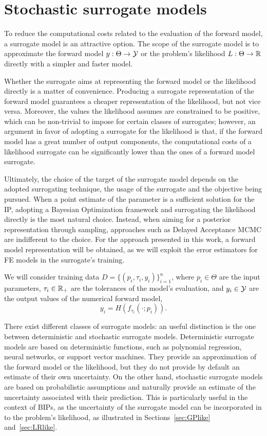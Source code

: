 \section{Stochastic surrogate models}\label{sec:surrogates}
To reduce the computational costs related to the evaluation of the forward model, a surrogate model is an attractive option.
The scope of the surrogate model is to approximate the forward model $y : \Theta \rightarrow \mathcal Y $ or the problem's likelihood $L: \Theta \rightarrow \mathbb{R} $ directly with a simpler and faster model.\newline

Whether the surrogate aims at representing the forward model or the likelihood directly is a matter of convenience.
Producing a surrogate representation of the forward model guarantees a cheaper representation of the likelihood, but not vice versa. Moreover, the values the likelihood assumes are constrained to be positive, which can be non-trivial to impose for certain classes of surrogates; however, an argument in favor of adopting a surrogate for the likelihood is that, if the forward model has a great number of output components, the computational costs of a likelihood surrogate can be significantly lower than the ones of a forward model surrogate.

Ultimately, the choice of the target of the surrogate model depends on the adopted surrogating technique, the usage of the surrogate and the objective being pursued.
When a point estimate of the parameter is a sufficient solution for the IP, adopting a Bayesian Optimization framework and surrogating the likelihood directly is the most natural choice.
Instead, when aiming for a posterior representation through sampling, approaches such as Delayed Acceptance MCMC \cite{ChristenFox2005} are indifferent to the choice.
For the approach presented in this work, a forward model representation will be obtained, as we will exploit the error estimators for FE models in the surrogate's training. \newline

We will consider training data $ D =\{ (p_i, \tau_i, y_i) \}_{i=1}^n $, where $ p_i \in \Theta $ are the input parameters, $ \tau_i \in \mathbb{R}_+ $ are the tolerances of the model's evaluation, and $ y_i \in \mathcal Y $ are the output values of the numerical forward model,\[ y_i = H(f_{\tau_i}(\cdot; p_i)). \]

There exist different classes of surrogate models: an useful distinction is the one between deterministic and stochastic surrogate models.
Deterministic surrogate models are based on deterministic functions, such as polynomial regression, neural networks, or support vector machines.
They provide an approximation of the forward model or the likelihood, but they do not provide by default an estimate of their own uncertainty.
On the other hand, stochastic surrogate models are based on probabilistic assumptions and naturally provide an estimate of the uncertainty associated with their prediction.
This is particularly useful in the context of BIPs, as the uncertainty of the surrogate model can be incorporated in to the problem's likelihood, as illustrated in Sections~\ref{sec:GPlike} and~\ref{sec:LRlike}. \newline

